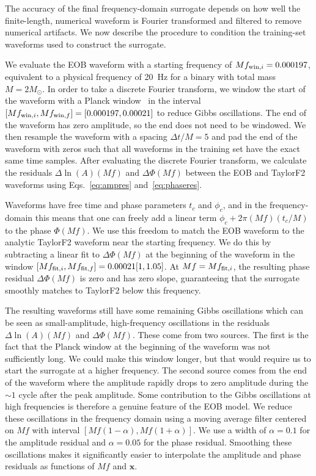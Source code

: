 \documentclass[prd,aps,letter,twocolumn,floatfix,notitlepage,nofootinbib]{revtex4-1}
\def\bx{\mathbf{x}}
\begin{document}
The accuracy of the final frequency-domain surrogate depends on how well the finite-length, numerical waveform is Fourier transformed and filtered to remove numerical artifacts. We now describe the procedure to condition the training-set waveforms used to construct the surrogate.

We evaluate the EOB waveform with a starting frequency of $Mf_{{\rm win}, i}=0.000197$, equivalent to a physical frequency of 20~Hz for a binary with total mass $M=2M_\odot$. In order to take a discrete Fourier transform, we window the start of the waveform with a Planck window~\cite{McKechanRobinsonSathyaprakash2010} in the interval $[Mf_{{\rm win}, i}, Mf_{{\rm win}, f}] = [0.000197, 0.00021]$ to reduce Gibbs oscillations. The end of the waveform has zero amplitude, so the end does not need to be windowed. We then resample the waveform with a spacing $\Delta t/M = 5$ and pad the end of the waveform with zeros such that all waveforms in the training set have the exact same time samples. After evaluating the discrete Fourier transform, we calculate the residuals $\Delta\ln(A)(Mf)$ and $\Delta\Phi(Mf)$ between the EOB and TaylorF2 waveforms using Eqs.~\eqref{eq:ampres} and~\eqref{eq:phaseres}. 

Waveforms have free time and phase parameters $t_c$ and $\phi_c$, and in the frequency-domain this means that one can freely add a linear term $\phi_c + 2\pi (Mf) (t_c/M)$ to the phase $\Phi(Mf)$. We use this freedom to match the EOB waveform to the analytic TaylorF2 waveform near the starting frequency. We do this by subtracting a linear fit to $\Delta\Phi(Mf)$ at the beginning of the waveform in the window $[Mf_{{\rm fit}, i}, Mf_{{\rm fit}, f}] = 0.00021[1, 1.05]$. At $Mf=Mf_{{\rm fit}, i}$, the resulting phase residual $\Delta\Phi(Mf)$ is zero and has zero slope, guaranteeing that the surrogate smoothly matches to TaylorF2 below this frequency.

The resulting waveforms still have some remaining Gibbs oscillations which can be seen as small-amplitude, high-frequency oscillations in the residuals $\Delta\ln(A)(Mf)$ and $\Delta\Phi(Mf)$. These come from two sources. The first is the fact that the Planck window at the beginning of the waveform was not sufficiently long. We could make this window longer, but that would require us to start the surrogate at a higher frequency. The second source comes from the end of the waveform where the amplitude rapidly drops to zero amplitude during the $\sim 1$ cycle after the peak amplitude. Some contribution to the Gibbs oscillations at high frequencies is therefore a genuine feature of the EOB model. We reduce these oscillations in the frequency domain using a moving average filter centered on $Mf$ with interval $[Mf(1-\alpha), Mf(1+\alpha)]$. We use a width of $\alpha=0.1$ for the amplitude residual and $\alpha=0.05$ for the phase residual. Smoothing these oscillations makes it significantly easier to interpolate the amplitude and phase residuals as functions of $Mf$ and $\bx$. 
\end{document}
